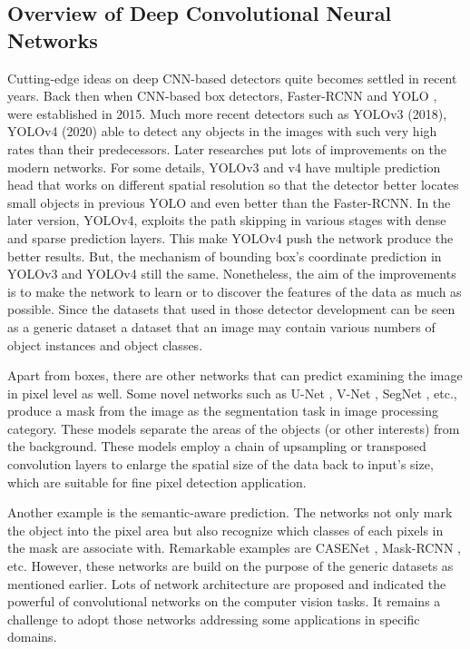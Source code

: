 \documentclass[default,pdflatex,iicol]{sn-jnl}%
\begin{document}
\subsection{Overview of Deep Convolutional Neural Networks}
Cutting-edge ideas on deep CNN-based detectors quite becomes settled in recent years. Back then when CNN-based box detectors, Faster-RCNN \cite{fasterrcnn} and YOLO \cite{redmonyolov1}, were established in 2015. Much more recent detectors such as YOLOv3 \cite{redmonyolov3} (2018), YOLOv4 \cite{alexyyolov4} (2020) able to detect any objects in the images with such very high rates than their predecessors. Later researches put lots of improvements on the modern networks. For some details, YOLOv3 and v4 have multiple prediction head that works on different spatial resolution so that the detector better locates small objects in previous YOLO and even better than the Faster-RCNN. In the later version, YOLOv4, exploits the path skipping in various stages with dense and sparse prediction layers. This make YOLOv4 push the network produce the better results. But, the mechanism of bounding box's coordinate prediction in YOLOv3 and YOLOv4 still the same. Nonetheless, the aim of the improvements is to make the network to learn or to discover the features of the data as much as possible. Since the datasets that used in those detector development can be seen as a generic dataset \textemdash a dataset that an image may contain various numbers of object instances and object classes. 

Apart from boxes, there are other networks that can predict examining the image in pixel level as well. Some novel networks such as U-Net \cite{unet}, V-Net \cite{vnet}, SegNet \cite{segnet}, etc., produce a mask from the image as the segmentation task in image processing category. These models separate the areas of the objects (or other interests) from the background. These models employ a chain of upsampling or transposed convolution layers to enlarge the spatial size of the data back to input's size, which are suitable for fine pixel detection application.

Another example is the semantic-aware prediction. The networks not only mark the object into the pixel area but also recognize which classes of each pixels in the mask are associate with. Remarkable examples are CASENet \cite{casenet}, Mask-RCNN \cite{maskrcnn}, etc. However, these networks are build on the purpose of the generic datasets as mentioned earlier. Lots of network architecture are proposed and indicated the powerful of convolutional networks on the computer vision tasks. It remains a challenge to adopt those networks addressing some applications in specific domains.
\end{document}
